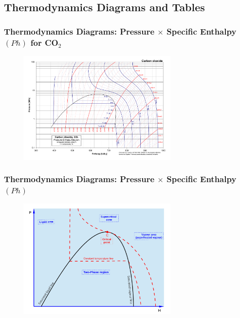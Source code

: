 \documentclass[10pt,compress]{beamer}
\begin{document}
\subsection{Thermodynamics Diagrams and Tables}

\begin{frame}
 \frametitle{Thermodynamics Diagrams: Pressure $\times$ Specific Enthalpy $(Ph)$ for CO$_{2}$}
  \begin{center}
   \begin{figure}
     \includegraphics[width=8cm,height=7.cm,clip]{./Pics/CO2col}
   \end{figure}
   \end{center}
\end{frame}

\begin{frame}
 \frametitle{Thermodynamics Diagrams: Pressure $\times$ Specific Enthalpy $(Ph)$}
  \begin{center}
   \begin{figure}
      \includegraphics[width=8cm,height=7.cm,clip]{./Pics/Overview_Refrig18}
   \end{figure}
   \end{center}
\end{frame}
\end{document}
